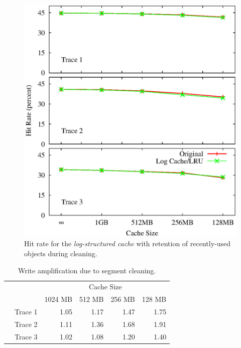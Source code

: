 \documentclass[letterpaper,twocolumn,10pt]{article}
\begin{document}
\begin{figure}
\centering
\includegraphics[width=0.9\columnwidth]{graphs/hit-rate-3}
\caption{Hit rate for the \emph{log-structured cache} with retention
  of recently-used objects during cleaning.}
\label{fig:hit-rate2}
\end{figure}

\vspace{30 mm}

\begin{table}[h]
{\footnotesize
\begin{tabular}{llrrrr}
\cline{2-6}
 &  & \multicolumn{4}{c}{Cache Size}                                                                                     \\ \cline{2-6} 
 &        & \multicolumn{1}{l}{1024 MB} & \multicolumn{1}{l}{512 MB} & \multicolumn{1}{l}{256 MB} & \multicolumn{1}{l}{128 MB} \\
 & Trace 1      & 1.05                        & 1.17                       & 1.47                       & 1.75                      \\
 & Trace 2      & 1.11                        & 1.36                       & 1.68                       & 1.91                      \\
 & Trace 3      & 1.02                        & 1.08                       & 1.20                       & 1.40                      \\ \cline{2-6} 
\end{tabular}
}
\caption{Write amplification due to segment cleaning.}
\label{table:write-amplification}
\end{table}
\end{document}
